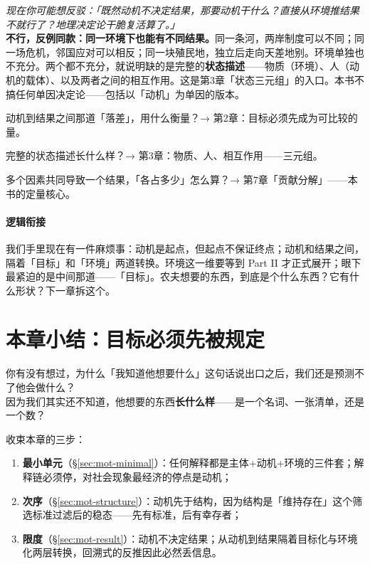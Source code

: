 \documentclass[../../main2.tex]{subfiles}
\begin{document}
	\begin{questionbox}
		\textit{现在你可能想反驳：「既然动机不决定结果，那要动机干什么？直接从环境推结果不就行了？地理决定论干脆复活算了。」}\\
		\textbf{不行，反例同款：同一环境下也能有不同结果。}同一条河，两岸制度可以不同；同一场危机，邻国应对可以相反；同一块殖民地，独立后走向天差地别。环境单独也不充分。两个都不充分，就说明缺的是完整的\textbf{状态描述}——物质（环境）、人（动机的载体）、以及两者之间的相互作用。这是第3章「状态三元组」的入口。本书不搞任何单因决定论——包括以「动机」为单因的版本。
	\end{questionbox}

	\begin{reader_anticipation}
		\item 动机到结果之间那道「落差」，用什么衡量？→ 第2章：目标必须先成为可比较的量。
		\item 完整的状态描述长什么样？→ 第3章：物质、人、相互作用——三元组。
		\item 多个因素共同导致一个结果，「各占多少」怎么算？→ 第7章「贡献分解」——本书的定量核心。
	\end{reader_anticipation}

	\paragraph*{逻辑衔接}
	我们手里现在有一件麻烦事：动机是起点，但起点不保证终点；动机和结果之间，隔着「目标」和「环境」两道转换。环境这一维要等到 Part II 才正式展开；眼下最紧迫的是中间那道——「目标」。农夫想要的东西，到底是个什么东西？它有什么形状？下一章拆这个。

	\section{本章小结：目标必须先被规定}
	\label{sec:mot-summary}

	\begin{readingnote}
		你有没有想过，为什么「我知道他想要什么」这句话说出口之后，我们还是预测不了他会做什么？\\
		因为我们其实还不知道，他想要的东西\textbf{长什么样}——是一个名词、一张清单，还是一个数？
	\end{readingnote}

	收束本章的三步：
	\begin{enumerate}
		\item \textbf{最小单元}（§\ref{sec:mot-minimal}）：任何解释都是主体+动机+环境的三件套；解释链必须停，对社会现象最经济的停点是动机；
		\item \textbf{次序}（§\ref{sec:mot-structure}）：动机先于结构，因为结构是「维持存在」这个筛选标准过滤后的稳态——先有标准，后有幸存者；
		\item \textbf{限度}（§\ref{sec:mot-result}）：动机不决定结果；从动机到结果隔着目标化与环境化两层转换，回溯式的反推因此必然丢信息。
	\end{enumerate}
\end{document}
